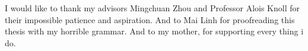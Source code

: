 \vspace{1cm}
I would like to thank my advisors Mingchuan Zhou and Professor Alois Knoll for their impossible patience and  aspiration. And to Mai Linh for proofreading this thesis with my horrible grammar. And to my mother, for supporting every thing i do.